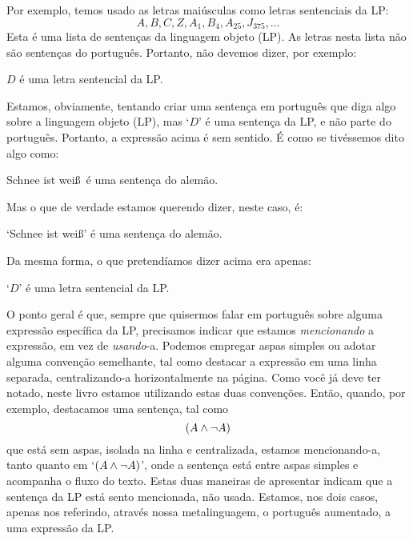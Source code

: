 Por exemplo, temos usado as letras maiúsculas como letras sentenciais da LP:
	$$A, B, C, Z, A_1, B_4, A_{25}, J_{375},\ldots$$
Esta é uma lista de sentenças da linguagem objeto (LP).
As letras nesta lista não são sentenças do português.
Portanto, não devemos dizer, por exemplo:
	\begin{ebullet}
		\item $D$ é uma letra sentencial da LP.
	\end{ebullet}
Estamos, obviamente, tentando criar uma sentença em português que diga algo sobre a linguagem objeto (LP), mas `$D$' é uma sentença da LP, e não parte do português.
Portanto, a expressão acima é sem sentido.
É como se tivéssemos dito algo como:
	\begin{ebullet}
		\item Schnee ist wei\ss\ é uma sentença do alemão.
	\end{ebullet}
Mas o que de verdade estamos querendo dizer, neste caso, é:
	\begin{ebullet}
		\item `Schnee ist wei\ss' é uma sentença do alemão.
	\end{ebullet}
Da mesma forma, o que pretendíamos dizer acima era apenas:
	\begin{ebullet}
		\item `$D$' é uma letra sentencial da LP.
	\end{ebullet}
O ponto geral é que, sempre que quisermos falar em português sobre alguma expressão específica da LP, precisamos indicar que estamos \emph{mencionando} a expressão, em vez de \emph{usando}-a.
Podemos empregar aspas simples ou adotar alguma convenção semelhante, tal como destacar a expressão em uma linha separada, centralizando-a horizontalmente na página.
Como você já deve ter notado, neste livro estamos utilizando estas duas convenções.
Então, quando, por exemplo, destacamos uma sentença, tal como $$(A \wedge \neg A)$$ que está sem aspas, isolada na linha e centralizada, estamos mencionando-a, tanto quanto em `$(A \wedge \neg A)$', onde a sentença está entre aspas simples e acompanha o fluxo do texto.
Estas duas maneiras de apresentar indicam que a sentença da LP está sento mencionada, não usada.
Estamos, nos dois casos, apenas nos referindo, através nossa metalinguagem, o português aumentado, a uma expressão da LP.


